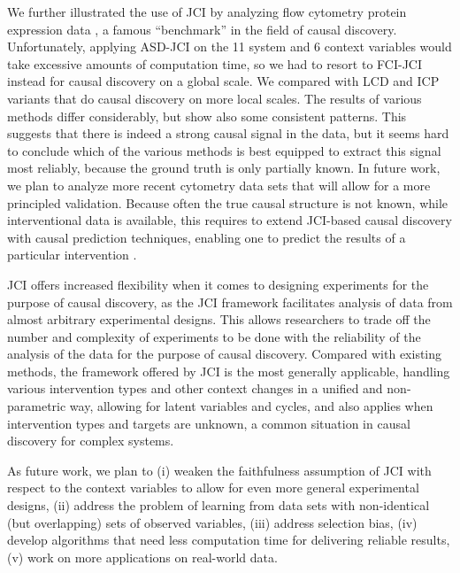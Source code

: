 \documentclass[twoside,11pt]{article}
\newcommand{\Joris}[1]{{\color{blue}#1}}
\begin{document}
We further illustrated the use of JCI by analyzing flow cytometry protein expression data
\citep{SPP05}, a famous ``benchmark'' in the field of causal discovery. Unfortunately, 
applying ASD-JCI on the 11 system
and 6 context variables would take excessive amounts of computation time, 
so we had to resort to FCI-JCI instead for causal discovery on a global scale. 
We compared with LCD and ICP variants that do causal discovery on more local scales.
The results of various methods differ considerably, but show also some consistent
patterns. This suggests that there is indeed a strong causal signal in the data, but
it seems hard to conclude which of the various methods is best equipped to extract 
this signal most reliably, because the ground truth is only partially known.
In future work, we plan to analyze more recent 
cytometry data sets that will allow for a more principled validation.
Because often the true causal structure is not known, while interventional
data is available, this requires to extend JCI-based causal discovery with causal 
prediction techniques, enabling one to predict the results of a particular 
intervention \citep{Magliacane++_NeurIPS_18}.

JCI offers increased flexibility 
when it comes to designing experiments for the purpose of causal discovery, 
as the JCI framework
facilitates analysis of data from almost arbitrary experimental designs. 
This allows researchers to
trade off the number and complexity of experiments to be done with the
reliability of the analysis of the data for the purpose of causal discovery.
Compared with existing methods, the framework offered by JCI is the most
generally applicable, handling various intervention types and other context
changes in a unified and non-parametric way, allowing for latent variables and
cycles, and also applies when intervention types and targets are unknown, a
common situation in causal discovery for complex systems.

As future work, we plan to (i) weaken the faithfulness assumption of JCI with respect
to the context variables to allow for even more general experimental designs, (ii)
address the problem of learning from data sets with non-identical (but overlapping)
sets of observed variables, (iii) address selection bias, (iv) develop algorithms
that need less computation time for delivering reliable results, (v) work on more 
applications on real-world data.

\end{document}

